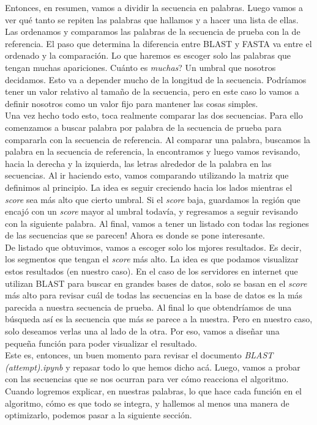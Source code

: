 \documentclass[10pt,letterpaper]{article}
\begin{document}
Entonces, en resumen, vamos a dividir la secuencia en palabras. Luego vamos a ver qu\'e tanto se repiten las palabras que hallamos y a hacer una lista de ellas. Las ordenamos y comparamos las palabras de la secuencia de prueba con la de referencia. El paso que determina la diferencia entre BLAST y FASTA va entre el ordenado y la comparaci\'on. Lo que haremos es escoger solo las palabras que tengan muchas apariciones. Cu\'anto es \emph{muchas}? Un umbral que nosotros decidamos. Esto va a depender mucho de la longitud de la secuencia. Podr\'iamos tener un valor relativo al tama\~no de la secuencia, pero en este caso lo vamos a definir nosotros como un valor fijo para mantener las cosas simples.\\

Una vez hecho todo esto, toca realmente comparar las dos secuencias. Para ello comenzamos a buscar palabra por palabra de la secuencia de prueba para compararla con la secuencia de referencia. Al comparar una palabra, buscamos la palabra en la secuencia de referencia, la encontramos y luego vamos revisando, hacia la derecha y la izquierda, las letras alrededor de la palabra en las secuencias. Al ir haciendo esto, vamos comparando utilizando la matriz que definimos al principio. La idea es seguir creciendo hacia los lados mientras el \emph{score} sea m\'as alto que cierto umbral. Si el \emph{score} baja, guardamos la regi\'on que encaj\'o con un \emph{score} mayor al umbral todav\'ia, y regresamos a seguir revisando con la siguiente palabra. Al final, vamos a tener un listado con todas las regiones de las secuencias que se parecen! Ahora es donde se pone interesante.\\

De listado que obtuvimos, vamos a escoger solo los mjores resultados. Es decir, los segmentos que tengan el \emph{score} m\'as alto. La idea es que podamos visualizar estos resultados (en nuestro caso). En el caso de los servidores en internet que utilizan BLAST para buscar en grandes bases de datos, solo se basan en el \emph{score} m\'as alto para revisar cu\'al de todas las secuencias en la base de datos es la m\'as parecida a nuestra secuencia de prueba. Al final lo que obtendr\'iamos de una b\'usqueda as\'i es la secuencia que m\'as se parece a la nuestra. Pero en nuestro caso, solo deseamos verlas una al lado de la otra. Por eso, vamos a dise\~nar una peque\~na funci\'on para poder visualizar el resultado.\\

Este es, entonces, un buen momento para revisar el documento \emph{BLAST (attempt).ipynb} y repasar todo lo que hemos dicho ac\'a. Luego, vamos a probar con las secuencias que se nos ocurran para ver c\'omo reacciona el algoritmo. Cuando logremos explicar, en nuestras palabras, lo que hace cada funci\'on en el algoritmo, c\'omo es que todo se integra, y hallemos al menos una manera de optimizarlo, podemos pasar a la siguiente secci\'on.
\end{document}
